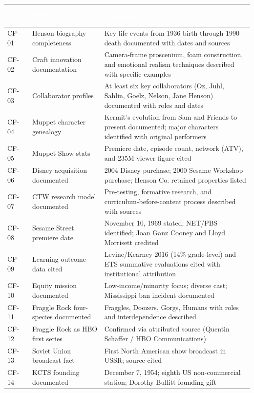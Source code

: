 \documentclass[11pt,letterpaper]{article}
\newcommand{\tableheader}[1]{\textbf{\sffamily\textcolor{white}{#1}}}
\begin{document}
\begin{center}
\begin{tabularx}{\textwidth}{C{1.5cm}L{4.5cm}X}
\toprule
{}
\tableheader{Test ID} & \tableheader{Verifies} & \tableheader{Expected} \\
\midrule
CF-01 & Henson biography completeness & Key life events from 1936 birth through 1990 death documented with dates and sources \\
CF-02 & Craft innovation documentation & Camera-frame proscenium, foam construction, and emotional realism techniques described with specific examples \\
CF-03 & Collaborator profiles & At least six key collaborators (Oz, Juhl, Sahlin, Goelz, Nelson, Jane Henson) documented with roles and dates \\
CF-04 & Muppet character genealogy & Kermit's evolution from Sam and Friends to present documented; major characters identified with original performers \\
CF-05 & Muppet Show stats & Premiere date, episode count, network (ATV), and 235M viewer figure cited \\
CF-06 & Disney acquisition documented & 2004 Disney purchase; 2000 Sesame Workshop purchase; Henson Co. retained properties listed \\
CF-07 & CTW research model documented & Pre-testing, formative research, and curriculum-before-content process described with sources \\
CF-08 & Sesame Street premiere date & November 10, 1969 stated; NET/PBS identified; Joan Ganz Cooney and Lloyd Morrisett credited \\
CF-09 & Learning outcome data cited & Levine/Kearney 2016 (14\% grade-level) and ETS summative evaluations cited with institutional attribution \\
CF-10 & Equity mission documented & Low-income/minority focus; diverse cast; Mississippi ban incident documented \\
CF-11 & Fraggle Rock four-species documented & Fraggles, Doozers, Gorgs, Humans with roles and interdependence described \\
CF-12 & Fraggle Rock as HBO first series & Confirmed via attributed source (Quentin Schaffer / HBO Communications) \\
CF-13 & Soviet Union broadcast fact & First North American show broadcast in USSR; source cited \\
CF-14 & KCTS founding documented & December 7, 1954; eighth US non-commercial station; Dorothy Bullitt founding gift \\

\end{tabularx}
\end{center}
\end{document}
